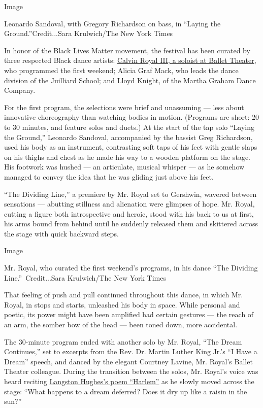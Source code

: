 Image

Leonardo Sandoval, with Gregory Richardson on bass, in ``Laying the
Ground.''Credit...Sara Krulwich/The New York Times

In honor of the Black Lives Matter movement, the festival has been
curated by three respected Black dance artists:
\href{https://www.abt.org/people/calvin-royal/?type=performer\&gclid=Cj0KCQjwyJn5BRDrARIsADZ9ykGukwgjIfy5GS0uVFO0vpgqra8aXLyIqvL8ApaOarDXLchnTxIYBTMaAqtmEALw_wcB}{Calvin
Royal III, a soloist at Ballet Theater}, who programmed the first
weekend; Alicia Graf Mack, who leads the dance division of the Juilliard
School; and Lloyd Knight, of the Martha Graham Dance Company.

For the first program, the selections were brief and unassuming --- less
about innovative choreography than watching bodies in motion. (Programs
are short: 20 to 30 minutes, and feature solos and duets.) At the start
of the tap solo ``Laying the Ground,'' Leonardo Sandoval, accompanied by
the bassist Greg Richardson, used his body as an instrument, contrasting
soft taps of his feet with gentle slaps on his thighs and chest as he
made his way to a wooden platform on the stage. His footwork was hushed
--- an articulate, musical whisper --- as he somehow managed to convey
the idea that he was gliding just above his feet.

``The Dividing Line,'' a premiere by Mr. Royal set to Gershwin, wavered
between sensations --- abutting stillness and alienation were glimpses
of hope. Mr. Royal, cutting a figure both introspective and heroic,
stood with his back to us at first, his arms bound from behind until he
suddenly released them and skittered across the stage with quick
backward steps.

Image

Mr. Royal, who curated the first weekend's programs, in his dance ``The
Dividing Line.''~Credit...Sara Krulwich/The New York Times

That feeling of push and pull continued throughout this dance, in which
Mr. Royal, in stops and starts, unleashed his body in space. While
personal and poetic, its power might have been amplified had certain
gestures --- the reach of an arm, the somber bow of the head --- been
toned down, more accidental.

The 30-minute program ended with another solo by Mr. Royal, ``The Dream
Continues,'' set to excerpts from the Rev. Dr. Martin Luther King Jr.'s
``I Have a Dream'' speech, and danced by the elegant Courtney Lavine,
Mr. Royal's Ballet Theater colleague. During the transition between the
solos, Mr. Royal's voice was heard reciting
\href{https://www.poetryfoundation.org/poems/46548/harlem}{Langston
Hughes's poem ``Harlem''} as he slowly moved across the stage: ``What
happens to a dream deferred? Does it dry up like a raisin in the sun?''

